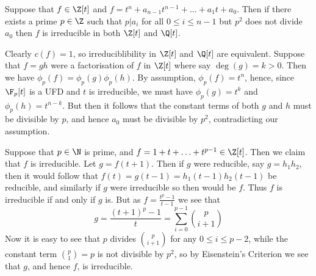 \documentclass{maths}
\begin{document}
\begin{lem}
    Suppose that $f\in\Z[t]$ and $f=t^n+a_{n-1}t^{n-1}+\ldots+a_1t+a_0$.
    Then if there exists a prime $p\in\Z$ such that $p|a_i$ for all $0\leqslant i\leqslant n-1$ but $p^2$ does not divide $a_0$ then $f$ is irreducible in both $\Z[t]$ and $\Q[t]$.
\end{lem}

\begin{prf}
    Clearly $c(f)=1$, so irreduciblibility in $\Z[t]$ and $\Q[t]$ are equivalent.
    Suppose that $f=gh$ were a factorisation of $f$ in $\Z[t]$ where say $\deg(g)=k>0$.
    Then we have $\phi_p(f)=\phi_p(g)\phi_p(h)$.
    By assumption, $\phi_p(f)=t^n$, hence, since $\F_p[t]$ is a UFD and $t$ is irreducible, we must have $\phi_p(g)=t^k$ and $\phi_p(h)=t^{n-k}$.
    But then it follows that the constant terms of both $g$ and $h$ must be divisible by $p$, and hence $a_0$ must be divisible by $p^2$, contradicting our assumption.
\end{prf}

\begin{ex}
    Suppose that $p\in\N$ is prime, and $f=1+t+\ldots+t^{p-1}\in\Z[t]$.
    Then we claim that $f$ is irreducible.
    Let $g=f(t+1)$.
    Then if $g$ were reducible, say $g=h_1 h_2$, then it would follow that $f(t)=g(t-1)=h_1(t-1)h_2(t-1)$ be reducible, and similarly if $g$ were irreducible so then would be $f$.
    Thus $f$ is irreducible if and only if $g$ is.
    But as $f=\frac{t^p-1}{t-1}$ we see that
    \[
        g=
        \frac{(t+1)^p-1}{t}=
        \sum_{i=0}^{p-1}\binom{p}{i+1}
    \]
    Now it is easy to see that $p$ divides $\binom{p}{i+1}$ for any $0\leqslant i\leqslant p-2$, while the constant term $\binom{p}{1}=p$ is not divisible by $p^2$, so by Eisenstein's Criterion we see that $g$, and hence $f$, is irreducible.
\end{ex}
\end{document}
